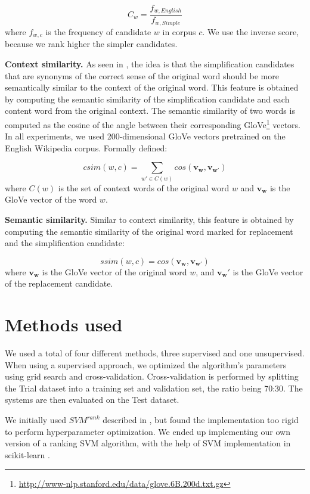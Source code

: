 \documentclass[10pt, a4paper]{article}
\begin{document}
\[ C_w = \frac{f_{w, English}}{f_{w, Simple}} \]
where $f_{w, c}$ is the frequency of candidate $w$ in corpus $c$. We use the inverse score, because we rank higher the simpler candidates.

\textbf{Context similarity.} As seen in \citep{glavavs2015simplifying}, the idea is that the simplification candidates that are synonyms of the correct sense of the original word should be more semantically similar to the context of the original word. This feature is obtained by computing the semantic similarity of the simplification candidate and each content word from the original context. The semantic similarity of two words is computed as the cosine of the angle between their corresponding GloVe\footnote{\url{http://www-nlp.stanford.edu/data/glove.6B.200d.txt.gz}} vectors. In all experiments, we used 200-dimensional GloVe vectors pretrained on the English Wikipedia corpus. Formally defined:

\[ csim(w, c) = \sum_{w' \in C(w)} cos(\mathbf{v_w}, \mathbf{v_{w'}}) \]
where $C(w)$ is the set of context words of the original word $w$ and $\mathbf{v_w}$ is the GloVe vector of the word $w$.

\textbf{Semantic similarity.} Similar to context similarity, this feature is obtained by computing the semantic similarity of the original word marked for replacement and the simplification candidate:

\[ ssim(w, c) = cos(\mathbf{v_w}, \mathbf{v_{w'}}) \]
where $\mathbf{v_w}$ is the GloVe vector of the original word $w$, and $\mathbf{v_w'}$ is the GloVe vector of the replacement candidate.

\section{Methods used}

We used a total of four different methods, three supervised and one unsupervised. When using a supervised approach, we optimized the algorithm's parameters using grid search and cross-validation. Cross-validation is performed by splitting the Trial dataset into a training set and validation set, the ratio being 70:30. The systems are then evaluated on the Test dataset.

We initially used $SVM^{rank}$ described in \citep{joachims2006training}, but found the implementation too rigid to perform hyperparameter optimization. We ended up implementing our own version of a ranking SVM algorithm, with the help of SVM implementation in scikit-learn \citep{pedregosa2011scikit}.
\end{document}
